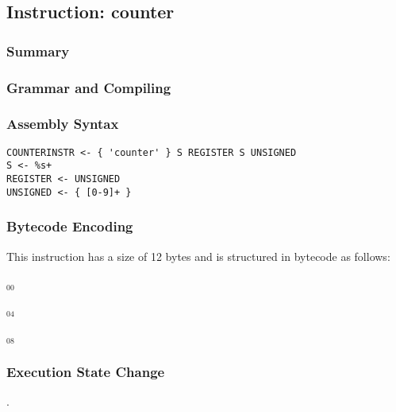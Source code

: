 \subsection{Instruction: counter}

\subsubsection{Summary}


\subsubsection{Grammar and Compiling}


\subsubsection{Assembly Syntax}

\begin{myquote}
\begin{verbatim}
COUNTERINSTR <- { 'counter' } S REGISTER S UNSIGNED
S <- %s+
REGISTER <- UNSIGNED
UNSIGNED <- { [0-9]+ }
\end{verbatim}
\end{myquote}


\subsubsection{Bytecode Encoding}

This instruction has a size of 12 bytes and is structured in bytecode as follows:

$_{00}$\ 



$_{04}$\ 



$_{08}$\ 
\fbox{%
  \parbox{20pt}{%
00
  }%
}


\subsubsection{Execution State Change}

.


